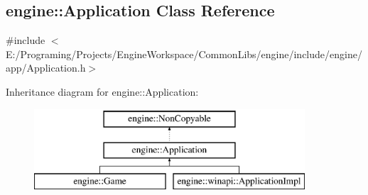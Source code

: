 \hypertarget{a00002}{}\subsection{engine\+:\+:Application Class Reference}
\label{a00002}


{\ttfamily \#include $<$E\+:/\+Programing/\+Projects/\+Engine\+Workspace/\+Common\+Libs/engine/include/engine/app/\+Application.\+h$>$}

Inheritance diagram for engine\+:\+:Application\+:\begin{figure}[H]
\begin{center}
\leavevmode
\includegraphics[height=3.000000cm]{a00002}
\end{center}
\end{figure}
